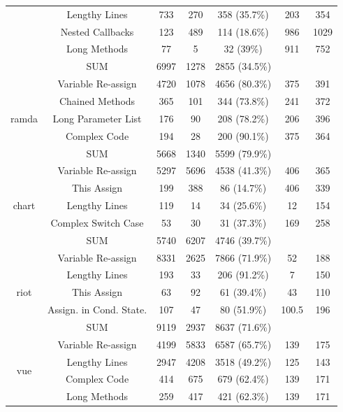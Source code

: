 {\begin{table}[!htbp]
\begin{tabular}{c|c|c|c|c|c|c}
		& Lengthy Lines & 733 & 270 & 358 (35.7\%) & 203 & 354 \\ \cline{2-7}
		& Nested Callbacks & 123 & 489 & 114 (18.6\%) & 986 & 1029 \\ \cline{2-7}
		& Long Methods & 77 & 5 & 32 (39\%) & 911 & 752 \\ \cline{2-7}
		& SUM & 6997 & 1278 & 2855 (34.5\%) & & \\ \hline
		\multirow{5}{*}{ramda}
		& Variable Re-assign & 4720 & 1078 & 4656 (80.3\%) & 375 & 391 \\ \cline{2-7}
		& Chained Methods & 365 & 101 & 344 (73.8\%) & 241 & 372 \\ \cline{2-7}
		& Long Parameter List & 176 & 90 & 208 (78.2\%) & 206 & 396 \\ \cline{2-7}
		& Complex Code & 194 & 28 & 200 (90.1\%) & 375 & 364 \\ \cline{2-7}
		& SUM & 5668 & 1340 & 5599 (79.9\%) & & \\ \hline
		\multirow{5}{*}{chart}
		& Variable Re-assign & 5297 & 5696 & 4538 (41.3\%) & 406 & 365 \\ \cline{2-7}
		& This Assign & 199 & 388 & 86 (14.7\%) & 406 & 339 \\ \cline{2-7}
		& Lengthy Lines & 119 & 14 & 34 (25.6\%) & 12 & 154 \\ \cline{2-7}
		& Complex Switch Case & 53 & 30 & 31 (37.3\%) & 169 & 258 \\ \cline{2-7}
		& SUM & 5740 & 6207 & 4746 (39.7\%) & & \\ \hline
		\multirow{5}{*}{riot}
		& Variable Re-assign & 8331 & 2625 & 7866 (71.9\%) & 52 & 188 \\ \cline{2-7}
		& Lengthy Lines & 193 & 33 & 206 (91.2\%) & 7 & 150 \\ \cline{2-7}
		& This Assign & 63 & 92 & 61 (39.4\%) & 43 & 110 \\ \cline{2-7}
		& Assign. in Cond. State. & 107 & 47 & 80 (51.9\%) & 100.5 & 196 \\ \cline{2-7}
		& SUM & 9119 & 2937 & 8637 (71.6\%) & & \\ \hline
		\multirow{5}{*}{vue}
		& Variable Re-assign & 4199 & 5833 & 6587 (65.7\%) & 139 & 175 \\ \cline{2-7}
		& Lengthy Lines & 2947 & 4208 & 3518 (49.2\%) & 125 & 143 \\ \cline{2-7}
		& Complex Code & 414 & 675 & 679 (62.4\%) & 139 & 171 \\ \cline{2-7}
		& Long Methods & 259 & 417 & 421 (62.3\%) & 139 & 171 \\ \cline{2-7}

\end{tabular}
\end{table}}
